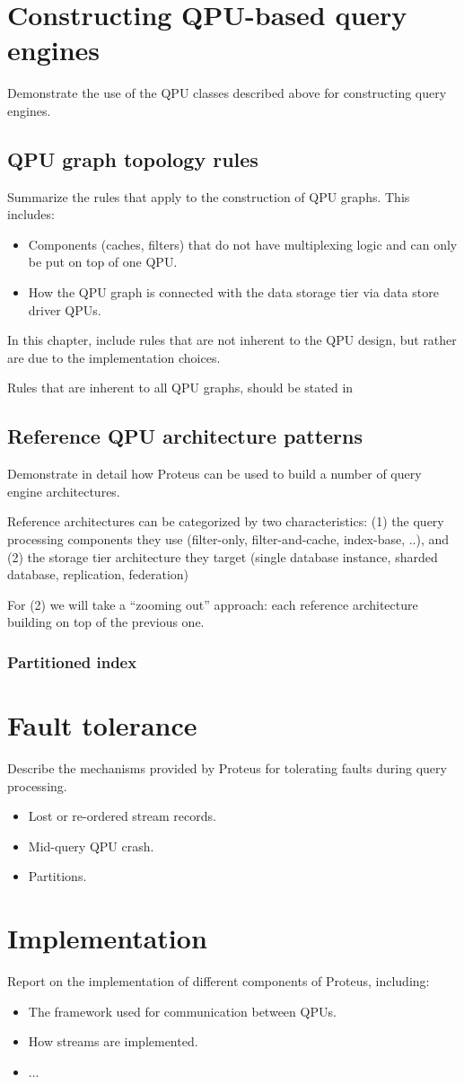 \section{Constructing QPU-based query engines}
Demonstrate the use of the QPU classes described above for constructing query
engines.

\subsection{QPU graph topology rules}
Summarize the rules that apply to the construction of QPU graphs.
This includes:
\begin{itemize}
  \item Components (caches, filters) that do not have multiplexing logic and can
  only be put on top of one QPU.
  \item How the QPU graph is connected with the data storage tier via data store
  driver QPUs.
\end{itemize}

In this chapter, include rules that are not inherent to the QPU design, but
rather are due to the implementation choices.

Rules that are inherent to all QPU graphs, should be stated in


\subsection{Reference QPU architecture patterns}
Demonstrate in detail how Proteus can be used to build a number of query engine
architectures.

Reference architectures can be categorized by two characteristics: (1) the query
processing components they use (filter-only, filter-and-cache, index-base, ..),
and (2) the storage tier architecture they target (single database instance,
sharded database, replication, federation)

For (2) we will take a ``zooming out'' approach: each reference architecture
building on top of the previous one.

\subsubsection{Partitioned index}

\section{Fault tolerance}
Describe the mechanisms provided by Proteus for tolerating faults during query
processing.
\begin{itemize}
  \item Lost or re-ordered stream records.
  \item Mid-query QPU crash.
  \item Partitions.
\end{itemize}

\section{Implementation}
Report on the implementation of different components of Proteus, including:
\begin{itemize}
  \item The framework used for communication between QPUs.
  \item How streams are implemented.
  \item ...
\end{itemize}
